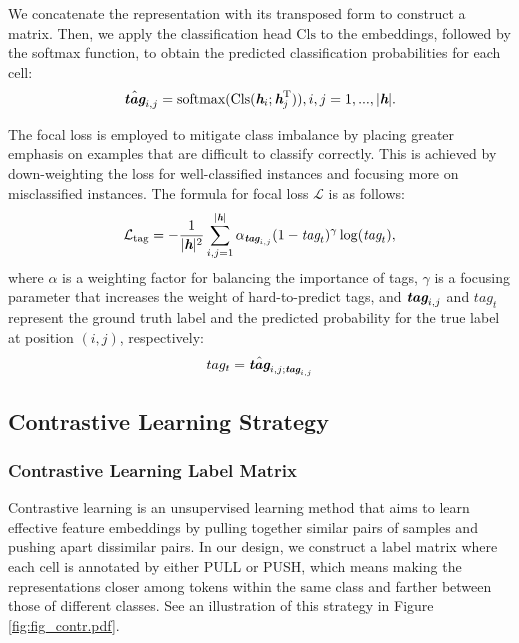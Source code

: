 \documentclass[11pt]{article}
\begin{document}
We concatenate the representation with its transposed form to construct a matrix. Then, we apply the classification head \(\mathrm{Cls}\) to the embeddings, followed by the softmax function, to obtain the predicted classification probabilities for each cell: 
\begin{equation}
   \setlength{\abovedisplayskip}{2pt}
   \setlength{\belowdisplayskip}{2pt}
   \hat{\textit{\textbf{tag}}}_{i,j} = \text{softmax}(\mathrm{Cls}(\textit{\textbf{h}}_i; \textit{\textbf{h}}_j^\mathrm{T})), i, j = 1, ..., |\textit{\textbf{h}}|.
   \label{eq:prediction}
\end{equation}

The focal loss \cite{lin2017focal} is employed to mitigate class imbalance by placing greater emphasis on examples that are difficult to classify correctly. This is achieved by down-weighting the loss for well-classified instances and focusing more on misclassified instances. The formula for focal loss \(\mathcal{L}\) is as follows:
\begin{equation}
\setlength{\abovedisplayskip}{2pt}
\setlength{\belowdisplayskip}{2pt}
    \mathcal{L}_{\text{tag}} = - \frac{1}{|\textit{\textbf{h}}|^2} \sum_{i,j=1}^{|\textit{\textbf{h}}|} \alpha_{\textit{\textbf{tag}}_{i,j}} (1 - \textit{tag}_{t})^\gamma \log(\textit{tag}_{t}), 
\label{eq:focal_loss}
\end{equation}
where \(\alpha\) is a weighting factor for balancing the importance of tags, \(\gamma\) is a focusing parameter that increases the weight of hard-to-predict tags, and \(\textit{\textbf{tag}}_{i,j}\) and \(tag_t\) represent the ground truth label and the predicted probability for the true label at position \((i, j)\), respectively:
\begin{equation}
\setlength{\abovedisplayskip}{2pt}
\setlength{\belowdisplayskip}{2pt}
    tag_t=\hat{\textit{\textbf{tag}}}_{i,j;\textit{\textbf{tag}}_{i,j}}
\label{eq:focal_loss_tag}
\end{equation}


\subsection{Contrastive Learning Strategy}
\subsubsection{Contrastive Learning Label Matrix}
Contrastive learning is an unsupervised learning method that aims to learn effective feature embeddings by pulling together similar pairs of samples and pushing apart dissimilar pairs. In our design, we construct a label matrix where each cell is annotated by either PULL or PUSH, which means making the representations closer among tokens within the same class and farther between those of different classes. 
See an illustration of this strategy in Figure \ref{fig:fig_contr.pdf}. 
\end{document}

